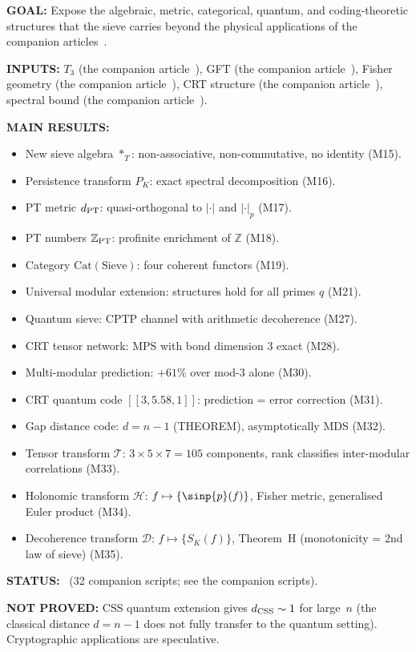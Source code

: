 \documentclass[12pt,a4paper]{article}
\begin{document}
\begin{statusbox}
\textbf{GOAL:}
  Expose the algebraic, metric, categorical, quantum, and coding-theoretic
  structures that the sieve carries beyond the physical applications of
  the companion articles~\cite{companion_M3,companion_physics}.

\textbf{INPUTS:}
  $T_3$ (the companion article~\cite{companion_M1}), GFT (the companion article~\cite{companion_M1}), Fisher geometry (the companion article~\cite{companion_M2}),
  CRT structure (the companion article~\cite{companion_M1}), spectral bound (the companion article~\cite{companion_M3}).

\textbf{MAIN RESULTS:}
  \begin{itemize}[nosep]
  \item New sieve algebra $*_T$: non-associative, non-commutative, no identity (M15).
  \item Persistence transform $P_K$: exact spectral decomposition (M16).
  \item PT metric $d_{\rm PT}$: quasi-orthogonal to $|\cdot|$ and $|\cdot|_p$ (M17).
  \item PT numbers $\mathbb{Z}_{\rm PT}$: profinite enrichment of $\mathbb{Z}$ (M18).
  \item Category $\mathrm{Cat}(\mathrm{Sieve})$: four coherent functors (M19).
  \item Universal modular extension: structures hold for all primes $q$ (M21).
  \item Quantum sieve: CPTP channel with arithmetic decoherence (M27).
  \item CRT tensor network: MPS with bond dimension 3 exact (M28).
  \item Multi-modular prediction: $+61\%$ over mod-3 alone (M30).
  \item CRT quantum code $[[3, 5.58, 1]]$: prediction = error correction (M31).
  \item Gap distance code: $d = n - 1$ (THEOREM), asymptotically MDS (M32).
  \item Tensor transform $\mathcal{T}$: $3{\times}5{\times}7 = 105$ components,
    rank classifies inter-modular correlations (M33).
  \item Holonomic transform $\mathcal{H}$: $f \mapsto \{\sinp{p}(f)\}$,
    Fisher metric, generalised Euler product (M34).
  \item Decoherence transform $\mathcal{D}$: $f \mapsto \{S_K(f)\}$,
    Theorem~H (monotonicity = 2nd law of sieve) (M35).
  \end{itemize}

\textbf{STATUS:}
  \VALTAG~(32 companion scripts; see the companion scripts).

\textbf{NOT PROVED:}
  CSS quantum extension gives $d_{\rm CSS} \sim 1$ for large~$n$
  (the classical distance $d = n-1$ does not fully transfer to the
  quantum setting). Cryptographic applications are speculative.
\end{statusbox}
\end{document}
